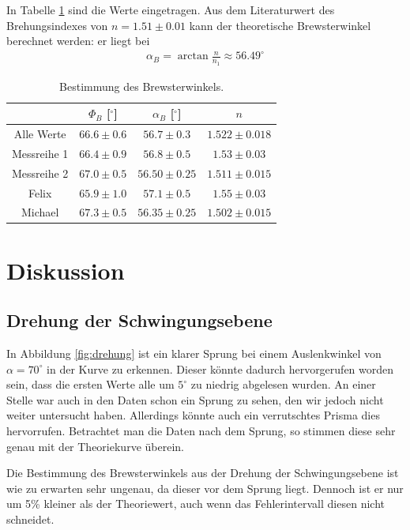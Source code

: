 \documentclass[12pt,a4paper,titlepage,headinclude,bibtotoc]{scrartcl}
\begin{document}
In Tabelle \ref{tab:brewster} sind die Werte eingetragen.
Aus dem Literaturwert des Brehungsindexes von $n=1.51\pm 0.01$ kann der theoretische Brewsterwinkel berechnet werden: er liegt bei
\begin{align}
	\alpha_B=\arctan \frac{n}{n_1}\approx 56.49^\circ
\end{align}
\begin{table}[!htb]
\centering
\begin{tabular}{|c|c|c|c|}
         \hline
         & $\Phi_B$ [$^\circ$] & $\alpha_B$ [$^\circ$] & $n$ \\
         \hline
         Alle Werte & $66.6 \pm 0.6$ & $56.7 \pm 0.3$ & $1.522 \pm 0.018$ \\
         Messreihe 1& $66.4 \pm 0.9$ & $56.8 \pm 0.5$ & $1.53 \pm 0.03$ \\
         Messreihe 2& $67.0 \pm 0.5$ & $56.50 \pm 0.25$ & $1.511 \pm 0.015$ \\
         \hline
         Felix & $65.9 \pm 1.0$ & $57.1 \pm 0.5$ & $1.55 \pm 0.03$ \\
         Michael & $67.3 \pm 0.5$ & $56.35 \pm 0.25$ & $1.502 \pm 0.015$ \\
         \hline
\end{tabular}
\caption{Bestimmung des Brewsterwinkels.}
\label{tab:brewster}
\end{table}



\section{Diskussion}
\label{sec:diskussion}
\subsection{Drehung der Schwingungsebene}
In Abbildung \ref{fig:drehung} ist ein klarer Sprung bei einem Auslenkwinkel von $\alpha=70^\circ$ in der Kurve zu erkennen.
Dieser könnte dadurch hervorgerufen worden sein, dass die ersten Werte alle um $5^\circ$ zu niedrig abgelesen wurden.
An einer Stelle war auch in den Daten schon ein Sprung zu sehen, den wir jedoch nicht weiter untersucht haben.
Allerdings könnte auch ein verrutschtes Prisma dies hervorrufen.
Betrachtet man die Daten nach dem Sprung, so stimmen diese sehr genau mit der Theoriekurve überein.

Die Bestimmung des Brewsterwinkels aus der Drehung der Schwingungsebene ist wie zu erwarten sehr ungenau, da dieser vor dem Sprung liegt.
Dennoch ist er nur um 5\% kleiner als der Theoriewert, auch wenn das Fehlerintervall diesen nicht schneidet.
\end{document}
